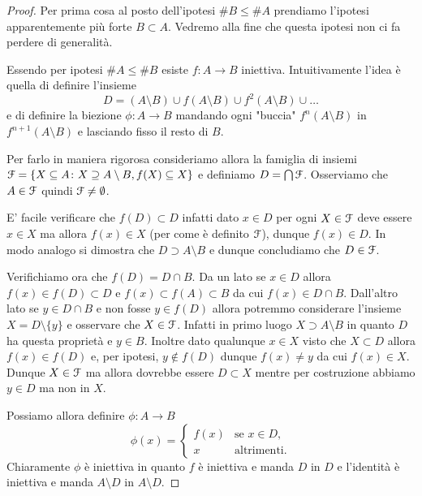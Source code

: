 \begin{proof}
Per prima cosa al posto dell'ipotesi $\# B \le \#A$ prendiamo
l'ipotesi apparentemente più forte $B\subset A$.
Vedremo alla fine che questa ipotesi non ci fa perdere di generalità.

Essendo per ipotesi $\#A \le \#B$ esiste $f\colon A \to B$ iniettiva.
Intuitivamente l'idea è quella di definire l'insieme
\[
 D = (A\setminus B)  \cup f(A\setminus B) \cup f^2(A\setminus B) \cup \dots
\]
e di definire la biezione $\phi \colon A \to B$ mandando ogni "buccia"
$f^n(A\setminus B)$ in $f^{n+1}(A\setminus B)$ e lasciando fisso
il resto di $B$.

Per farlo in maniera rigorosa
consideriamo allora la famiglia di insiemi $\mathcal F = \{X \subseteq A \colon X \supseteq A \setminus B, f(X) \subseteq X\}$ e definiamo $D = \bigcap \mathcal F$.
Osserviamo che $A \in \mathcal F$ quindi $\mathcal F\neq \emptyset$.

E' facile verificare che $f(D) \subset D$ infatti dato $x\in D$ per ogni $X\in \mathcal F$ deve essere $x\in X$ ma allora $f(x) \in X$ (per come è definito $\mathcal F$), dunque $f(x) \in D$. In modo analogo si dimostra che $D\supset A\setminus B$ e dunque concludiamo che $D\in \mathcal F$.

Verifichiamo ora che $f(D)=D\cap B$. Da un lato se $x\in D$ allora
$f(x) \in f(D)\subset D$ e $f(x)\subset f(A)\subset B$ da cui $f(x) \in D\cap B$.
Dall'altro lato se $y\in D \cap B$ e non fosse $y \in f(D)$
allora potremmo considerare l'insieme $X=D\setminus\{y\}$
e osservare che $X\in \mathcal F$.
Infatti in primo luogo $X \supset A \setminus B$ in quanto $D$ ha questa proprietà e $y \in B$.
Inoltre dato qualunque $x \in X$ visto che $X\subset D$ allora
$f(x) \in f(D)$ e, per ipotesi,
$y\not \in f(D)$ dunque $f(x)\neq y$ da cui $f(x) \in X$.
Dunque $X\in \mathcal F$ ma allora dovrebbe essere $D\subset X$ mentre
per costruzione abbiamo $y\in D$ ma non in $X$.


Possiamo allora definire $\phi \colon A \to B$
\[
\phi(x) =
\begin{cases}
   f(x) & \text{se $x\in D$}, \\
   x & \text{altrimenti.}
\end{cases}
\]
Chiaramente $\phi$ è iniettiva in quanto $f$ è iniettiva e manda $D$ in $D$
e l'identità è iniettiva e manda $A\setminus D$ in $A\setminus D$.


\end{proof}
